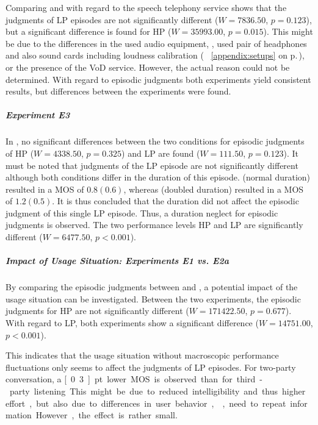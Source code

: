 Comparing \EIIa{} and \EIIb{} with regard to the speech telephony service shows that the judgments of \ac{LP} episodes are not significantly different ($W=7836.50$, $p=0.123$), but a significant difference is found for \ac{HP} ($W=35993.00$, $p=0.015$).
This might be due to the differences in the used audio equipment, \ie, used pair of headphones and also sound cards including loudness calibration (\cf{} \appendix{}~\ref{appendix:setups} on p.\,\pageref{appendix:setups}), or the presence of the \ac{VoD} service.
However, the actual reason could not be determined.
With regard to episodic judgments both experiments yield consistent results, but differences between the experiments were found.

\subparagraph*{Experiment E3}
In , no significant differences between the two conditions for episodic judgments of \ac{HP} ($W=4338.50$, $p=0.325$) and \ac{LP} are found ($W=111.50$, $p=0.123$).
It must be noted that judgments of the \ac{LP} episode are not significantly different although both conditions differ in the duration of this episode.
\CIIa{} (normal duration) resulted in a \ac{MOS} of $0.8 (0.6)$, whereas \CIIb{} (doubled duration) resulted in a \ac{MOS} of $1.2 (0.5)$.
It is thus concluded that the duration did not affect the episodic judgment of this single \ac{LP} episode.
Thus, a duration neglect for episodic judgments is observed.
The two performance levels \ac{HP} and \ac{LP} are significantly different ($W=6477.50$, $p<0.001$).


\subparagraph*{Impact of Usage Situation: Experiments E1 vs. E2a}
By comparing the episodic judgments between  and \EIIa{}, a potential impact of the usage situation can be investigated.
Between the two experiments, the episodic judgments for \ac{HP} are not significantly different ($W=171422.50$, $p=0.677$).
With regard to \ac{LP}, both experiments show a significant difference ($W=14751.00$, $p<0.001$).

This indicates that the usage situation without macroscopic performance fluctuations only seems to affect the judgments of \ac{LP} episodes.
For two-party conversation, a \unit[0.3]{pt} lower \ac{MOS} is observed than for third-party listening.
This might be due to reduced intelligibility and thus higher effort, but also due to differences in user behavior, \eg, need to repeat information.
However, the effect is rather small.


